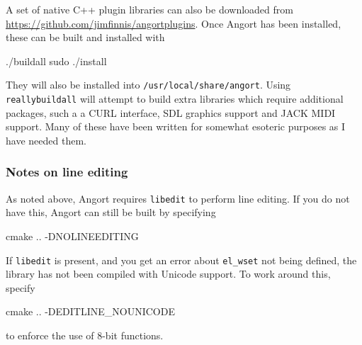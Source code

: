 A set
of native C++ plugin libraries can also be downloaded from
\url{https://github.com/jimfinnis/angortplugins}. Once Angort has
been installed, these can be built and installed with
\begin{v}
./buildall
sudo ./install
\end{v}
They will also be installed into \texttt{/usr/local/share/angort}.
Using \texttt{reallybuildall} will attempt to build extra libraries
which require additional packages, such a a CURL interface, SDL
graphics support and JACK MIDI support. Many of these have been written for
somewhat esoteric purposes as I have needed them.


\subsubsection{Notes on line editing}
As noted above, Angort requires \texttt{libedit} to perform
line editing. If you do not have this, Angort can still be built
by specifying
\begin{v}
cmake .. -DNOLINEEDITING
\end{v}
If \texttt{libedit} is present, and you get an error about \texttt{el\_wset} not
being defined, the library has not been compiled with Unicode support.
To work around this, specify
\begin{v}
cmake .. -DEDITLINE_NOUNICODE
\end{v}
to enforce the use of 8-bit functions.
